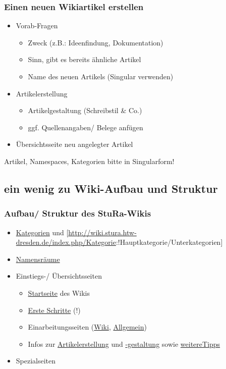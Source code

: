 \documentclass{beamer}              %
\begin{document}
\begin{frame}
  \frametitle{Einen neuen Wikiartikel erstellen}
  \begin{itemize}[<+->]
    \item Vorab-Fragen
    \begin{itemize}
      \item Zweck (z.B.: Ideenfindung, Dokumentation)
      \item Sinn, gibt es bereits ähnliche Artikel
      \item Name des neuen Artikels (Singular verwenden)
    \end{itemize}
    \item Artikelerstellung
    \begin{itemize}
      \item Artikelgestaltung (Schreibstil \& Co.)
      \item ggf. Quellenangaben/ Belege anfügen
    \end{itemize}
    \item Übersichtsseite neu angelegter Artikel
  \end{itemize}
  Artikel, Namespaces, Kategorien bitte in Singularform!
\end{frame}

\subsection{ein wenig zu Wiki-Aufbau und Struktur}

\begin{frame}
  \frametitle{Aufbau/ Struktur des StuRa-Wikis}
  \begin{itemize}[<+->]
    \item \href{http://wiki.stura.htw-dresden.de/index.php/Spezial:Kategorien}{Kategorien} und [\url{http://wiki.stura.htw-dresden.de/index.php/Kategorie}:!Hauptkategorie/Unterkategorien]
    \item \href{http://wiki.stura.htw-dresden.de/index.php/Admin:Namensr\%C3\%A4ume}{Namensräume}
    \item Einstiegs-/ Übersichtsseiten
    \begin{itemize}
      \item \href{http://wiki.stura.htw-dresden.de/index.php/Hauptseite}{Startseite} des Wikis
      \item \href{http://wiki.stura.htw-dresden.de/index.php/StuRa_HTW_Dresden:Erste_Schritte}{Erste Schritte} (!)
      \item Einarbeitungsseiten (\href{http://wiki.stura.htw-dresden.de/index.php/Wiki/Einarbeitung}{Wiki}, \href{http://wiki.stura.htw-dresden.de/index.php/Einarbeitung}{Allgemein})
      \item Infos zur \href{http://wiki.stura.htw-dresden.de/index.php/Artikelerstellung}{Artikelerstellung} und \href{http://wiki.stura.htw-dresden.de/index.php/Admin:Artikelgestaltung}{-gestaltung} sowie \href{https://de.wikipedia.org/wiki/Wikipedia:Wie_schreibe_ich_gute_Artikel}{weitereTipps}
    \end{itemize}
    \item Spezialseiten
  \end{itemize}
\end{frame}
\end{document}
